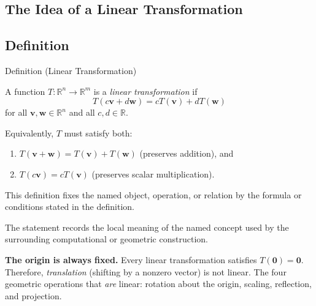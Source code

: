 
\subsection{The Idea of a Linear Transformation}

\subsection*{Definition}

\begin{definitionbox}{Definition (Linear Transformation)}
\begin{definition}
\label{def:linear-transformation}
A function $T : \mathbb{R}^n \to \mathbb{R}^m$ is a \emph{linear transformation} if
\[
  T(c\mathbf{v} + d\mathbf{w}) = cT(\mathbf{v}) + dT(\mathbf{w})
\]
for all $\mathbf{v}, \mathbf{w} \in \mathbb{R}^n$ and all $c, d \in \mathbb{R}$.

Equivalently, $T$ must satisfy both:
\begin{enumerate}
  \item $T(\mathbf{v} + \mathbf{w}) = T(\mathbf{v}) + T(\mathbf{w})$ \quad (preserves addition), and
  \item $T(c\mathbf{v}) = cT(\mathbf{v})$ \quad (preserves scalar multiplication).
\end{enumerate}
\end{definition}
\end{definitionbox}
\begin{remark*}
This definition fixes the named object, operation, or relation by the formula
or conditions stated in the definition.
\end{remark*}

\begin{remark*}[Interpretation]
The statement records the local meaning of the named concept used by the
surrounding computational or geometric construction.
\end{remark*}

\DefinitionalRoot

\begin{remark*}[Exposition]
\textbf{The origin is always fixed.}
Every linear transformation satisfies $T(\mathbf{0}) = \mathbf{0}$.
Therefore, \emph{translation} (shifting by a nonzero vector) is not linear.
The four geometric operations that \emph{are} linear: rotation about the origin,
scaling, reflection, and projection.
\end{remark*}

